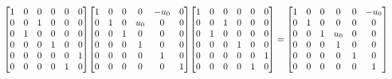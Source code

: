 \documentclass[11pt]{article}
\theoremstyle{definition}
\begin{document}
\[
\scaletoalign{\textwidth}{{\left[\begin{matrix}1 & 0 & 0 & 0 & 0 & 0\\0 & 0 & 1 & 0 & 0 & 0\\0 & 1 & 0 & 0 & 0 & 0\\0 & 0 & 0 & 1 & 0 & 0\\0 & 0 & 0 & 0 & 0 & 1\\0 & 0 & 0 & 0 & 1 & 0\end{matrix}\right]} {\left[\begin{matrix}1 & 0 & 0 & 0 & - u_{0} & 0\\0 & 1 & 0 & u_{0} & 0 & 0\\0 & 0 & 1 & 0 & 0 & 0\\0 & 0 & 0 & 1 & 0 & 0\\0 & 0 & 0 & 0 & 1 & 0\\0 & 0 & 0 & 0 & 0 & 1\end{matrix}\right]} {\left[\begin{matrix}1 & 0 & 0 & 0 & 0 & 0\\0 & 0 & 1 & 0 & 0 & 0\\0 & 1 & 0 & 0 & 0 & 0\\0 & 0 & 0 & 1 & 0 & 0\\0 & 0 & 0 & 0 & 0 & 1\\0 & 0 & 0 & 0 & 1 & 0\end{matrix}\right]} = {\left[\begin{matrix}1 & 0 & 0 & 0 & 0 & - u_{0}\\0 & 1 & 0 & 0 & 0 & 0\\0 & 0 & 1 & u_{0} & 0 & 0\\0 & 0 & 0 & 1 & 0 & 0\\0 & 0 & 0 & 0 & 1 & 0\\0 & 0 & 0 & 0 & 0 & 1\end{matrix}\right]}}
\]
\end{document}
